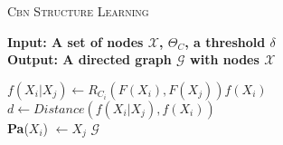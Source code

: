 \begin{algorithm}[H]
\caption{\textsc{Cbn Structure Learning}}
\label{algor:falseStrLrn}
\textbf{Input: A set of nodes $\mathcal{X}$, $\Theta_C$, a threshold $\delta$} \\
\textbf{Output: A directed graph $\mathcal{G}$ with nodes $\mathcal{X}$}
	\begin{algorithmic}
				\STATE $f(X_i|X_j) \leftarrow R_{C_i}(F(X_i), F(X_j))f(X_i)$ \\
				\STATE $d \leftarrow Distance(f(X_i|X_j), f(X_i))$ \\
					\STATE \textbf{Pa}($X_i$) $\leftarrow X_j$		
				\ENDIF
			\ENDFOR		
		\ENDFOR
		\RETURN $\mathcal{G}$
	\end{algorithmic}
\end{algorithm}